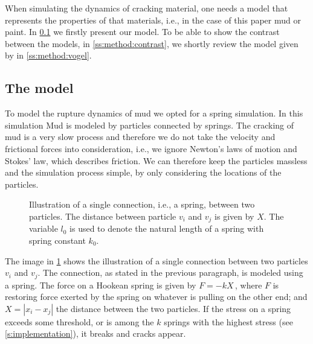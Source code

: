 
When simulating the dynamics of cracking material, one needs a model that represents the properties of that materials, i.e., in the case of this paper mud or paint. In \cref{ss:method:model} we firstly present our model. To be able to show the contrast between the models, in \cref{ss:method:contrast}, we shortly review the model given by \citeauthor{vogel2005studies2} in \cref{ss:method:vogel}.

\subsection{The model}\label{ss:method:model}

To model the rupture dynamics of mud we opted for a spring simulation. In this simulation Mud is modeled by particles connected by springs. The cracking of mud is a very slow process and therefore we do not take the velocity and frictional forces into consideration, i.e., we ignore Newton's laws of motion and Stokes' law, which describes friction. We can therefore keep the particles massless and the simulation process simple, by only considering the locations of the particles. 

\begin{figure}
	\centering
	\singleSpring
	\caption{Illustration of a single connection, i.e., a spring, between two particles. The distance between particle $v_i$ and $v_j$ is given by $X$. The variable $l_0$ is used to denote the natural length of a spring with spring constant $k_0$.}
	\label{fig:method:spring}
\end{figure}

The image in \cref{fig:method:spring} shows the illustration of a single connection between two particles $v_i$ and $v_j$. The connection, as stated in the previous paragraph, is modeled using a spring. The force on a Hookean spring is given by $F = -k X\,$, where $F$ is restoring force exerted by the spring on whatever is pulling on the other end; and $X = |x_i - x_j|$ the distance between the two particles. If the stress on a spring exceeds some threshold, or is among the $k$ springs with the highest stress (see \cref{s:implementation}), it breaks and cracks appear.


